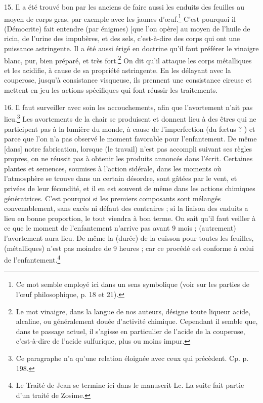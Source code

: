\documentclass[a4paper, 11pt, oneside, polutonikogreek, french]{article}
\begin{document}
15. Il a été trouvé bon par les anciens de faire aussi les enduits des feuilles au moyen de corps gras, par exemple avec les jaunes d'œuf.\footnote{Ce mot semble employé ici dans un sens symbolique (voir sur les parties de l'œuf philosophique, p. 18 et 21).} C'est pourquoi il (Démocrite) fait entendre (par énigmes) [que l'on opère] au moyen de l'huile de ricin, de l'urine des impubères, et des sels, c'est-à-dire des corps qui ont une puissance astringente. Il a été aussi érigé en doctrine qu'il faut préférer le vinaigre blanc, pur, bien préparé, et très fort.\footnote{Le mot vinaigre, dans la langue de nos auteurs, désigne toute liqueur acide, alcaline, ou généralement douée d'activité chimique. Cependant il semble que, dans te passage actuel, il s'agisse en particulier de l'acide de la couperose, c'est-à-dire de l'acide sulfurique, plus ou moins impur.} On dit qu'il attaque les corps métalliques et les acidifie, à cause de sa propriété astringente. En les délayant avec la couperose, jusqu'à consistance visqueuse, ils prennent une consistance cireuse et mettent en jeu les actions spécifiques qui font réussir les traitements.

16. Il faut surveiller avec soin les accouchements, afin que l'avortement n'ait pas lieu.\footnote{Ce paragraphe n'a qu'une relation éloignée avec ceux qui précèdent. Cp. p. 198.} Les avortements de la chair se produisent et donnent lieu à des êtres qui ne participent pas à la lumière du monde, à cause de l'imperfection (du fœtus ? ) et parce que l'on n'a pas observé le moment favorable pour l'enfantement. De même [dans] notre fabrication, lorsque (le travail) n'est pas accompli suivant ses règles propres, on ne réussit pas à obtenir les produits annoncés dans l'écrit. Certaines plantes et semences, soumises à l'action sidérale, dans les moments où l'atmosphère se trouve dans un certain désordre, sont gâtées par le vent, et privées de leur fécondité, et il en est souvent de même dans les actions chimiques génératrices. C'est pourquoi si les premiers composants sont mélangés convenablement, sans excès ni défaut des contraires ; si la liaison des enduits a lieu en bonne proportion, le tout viendra à bon terme. On sait qu'il faut veiller à ce que le moment de l'enfantement n'arrive pas avant 9 mois ; (autrement) l'avortement aura lieu. De même la (durée) de la cuisson pour toutes les feuilles, (métalliques) n'est pas moindre de 9 heures ; car ce procédé est conforme à celui de l'enfantement.\footnote{Le Traité de Jean se termine ici dans le manuscrit Lc. La suite fait partie d'un traité de Zosime.}
\end{document}
